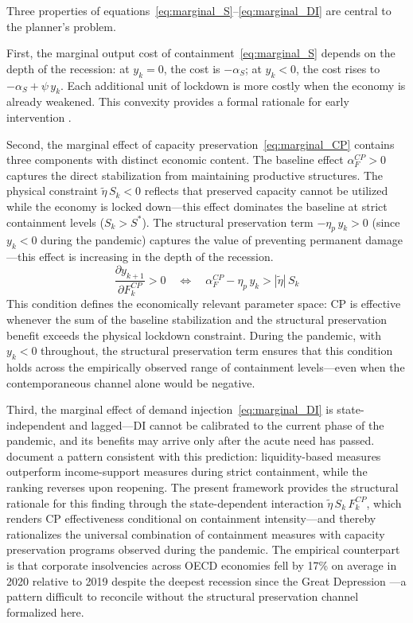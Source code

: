 \noindent Three properties of equations~\eqref{eq:marginal_S}--\eqref{eq:marginal_DI} are central to the planner's problem.

First, the marginal output cost of containment~\eqref{eq:marginal_S} depends on the depth of the recession: at $y_k = 0$, the cost is $-\alpha_S$; at $y_k < 0$, the cost rises to $-\alpha_S + \psi\, y_k$. Each additional unit of lockdown is more costly when the economy is already weakened. This convexity provides a formal rationale for early intervention \citep{acemoglu2021}.

Second, the marginal effect of capacity preservation~\eqref{eq:marginal_CP} contains three components with distinct economic content. The baseline effect $\alpha^{CP}_F > 0$ captures the direct stabilization from maintaining productive structures. The physical constraint $\tilde{\eta}\, S_k < 0$ reflects that preserved capacity cannot be utilized while the economy is locked down---this effect dominates the baseline at strict containment levels ($S_k > S^*$). The structural preservation term $-\eta_p\, y_k > 0$ (since $y_k < 0$ during the pandemic) captures the value of preventing permanent damage---this effect is increasing in the depth of the recession.
%
\begin{equation}
    \frac{\partial y_{k+1}}{\partial F^{CP}_k} > 0 \quad \Longleftrightarrow \quad \alpha^{CP}_F - \eta_p\, y_k > |\tilde{\eta}|\, S_k
    \label{eq:cp_positive}
\end{equation}
%
This condition defines the economically relevant parameter space: CP is effective whenever the sum of the baseline stabilization and the structural preservation benefit exceeds the physical lockdown constraint. During the pandemic, with $y_k < 0$ throughout, the structural preservation term ensures that this condition holds across the empirically observed range of containment levels---even when the contemporaneous channel alone would be negative.

Third, the marginal effect of demand injection~\eqref{eq:marginal_DI} is state-independent and lagged---DI cannot be calibrated to the current phase of the pandemic, and its benefits may arrive only after the acute need has 
passed. \citet{deb2021} document a pattern consistent with this prediction: liquidity-based measures outperform income-support measures during strict containment, while the ranking reverses upon reopening. The present framework provides the structural rationale for this finding through the state-dependent interaction $\tilde{\eta}\,S_k\,F^{CP}_k$, which renders CP effectiveness conditional on containment intensity---and thereby rationalizes the universal combination of containment measures with capacity preservation programs observed during the pandemic. The empirical 
counterpart is that corporate insolvencies across OECD economies fell by 17\% on average in 2020 relative to 2019 despite the deepest recession since the Great Depression \citep{djankov2021, banerjee2021}---a pattern difficult to reconcile without the structural preservation channel formalized here.

